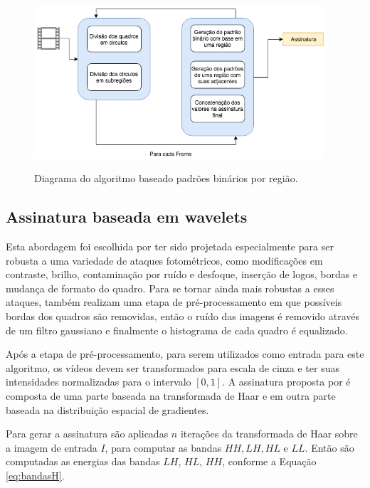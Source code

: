  \begin{figure}[h]
      \centering
      \caption{Diagrama do algoritmo baseado padrões binários por região.}
      \includegraphics[width=0.96\textwidth]{dados/figuras/diagramas/Diag-RBP}
       	\label{fig:dia_rbp}
    \end{figure}  

    
%
%

\subsection{Assinatura baseada em wavelets}
\label{wavelets}

Esta abordagem foi escolhida por ter sido projetada especialmente para ser robusta a uma variedade de ataques fotométricos, como modificações em contraste, brilho, contaminação por ruído e desfoque, inserção de logos, bordas e mudança de formato do quadro. Para se tornar ainda mais robustas a esses ataques,  também realizam uma etapa de pré-processamento em que possíveis bordas dos quadros são removidas, então o ruído das imagens é removido através de um filtro gaussiano e finalmente o histograma de cada quadro é equalizado. 

Após a etapa de pré-processamento, para serem utilizados como entrada para este algoritmo, os vídeos devem ser transformados para escala de cinza e ter suas intensidades normalizadas para o intervalo $[0,1]$. A assinatura proposta por  é composta de uma parte baseada na transformada de Haar e em outra parte baseada na distribuição espacial de gradientes.

 Para gerar a assinatura são aplicadas $n$ iterações da transformada de Haar sobre a imagem de entrada $I$, para computar as bandas $HH, LH, HL$ e $LL$.  Então são computadas as energias das bandas $LH$, $HL$, $HH$, conforme a Equação \ref{eq:bandasH}.
 
